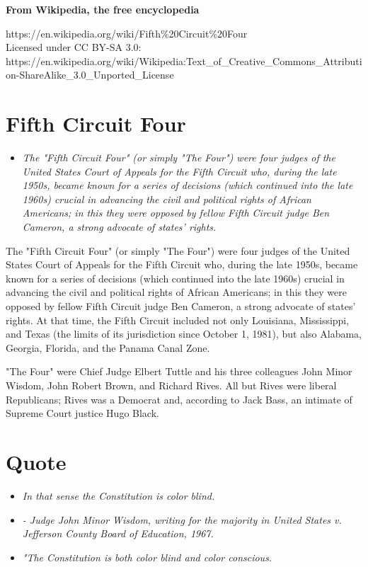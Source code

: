\textbf{From Wikipedia, the free encyclopedia}

https://en.wikipedia.org/wiki/Fifth\%20Circuit\%20Four\\
Licensed under CC BY-SA 3.0:\\
https://en.wikipedia.org/wiki/Wikipedia:Text\_of\_Creative\_Commons\_Attribution-ShareAlike\_3.0\_Unported\_License

\section{Fifth Circuit Four}\label{fifth-circuit-four}

\begin{itemize}
\item
  \emph{The "Fifth Circuit Four" (or simply "The Four") were four judges
  of the United States Court of Appeals for the Fifth Circuit who,
  during the late 1950s, became known for a series of decisions (which
  continued into the late 1960s) crucial in advancing the civil and
  political rights of African Americans; in this they were opposed by
  fellow Fifth Circuit judge Ben Cameron, a strong advocate of states'
  rights.}
\end{itemize}

The "Fifth Circuit Four" (or simply "The Four") were four judges of the
United States Court of Appeals for the Fifth Circuit who, during the
late 1950s, became known for a series of decisions (which continued into
the late 1960s) crucial in advancing the civil and political rights of
African Americans; in this they were opposed by fellow Fifth Circuit
judge Ben Cameron, a strong advocate of states' rights. At that time,
the Fifth Circuit included not only Louisiana, Mississippi, and Texas
(the limits of its jurisdiction since October 1, 1981), but also
Alabama, Georgia, Florida, and the Panama Canal Zone.

"The Four" were Chief Judge Elbert Tuttle and his three colleagues John
Minor Wisdom, John Robert Brown, and Richard Rives. All but Rives were
liberal Republicans; Rives was a Democrat and, according to Jack Bass,
an intimate of Supreme Court justice Hugo Black.

\section{Quote}\label{quote}

\begin{itemize}
\item
  \emph{In that sense the Constitution is color blind.}
\item
  \emph{- Judge John Minor Wisdom, writing for the majority in United
  States v. Jefferson County Board of Education, 1967.}
\item
  \emph{"The Constitution is both color blind and color conscious.}
\end{itemize}

